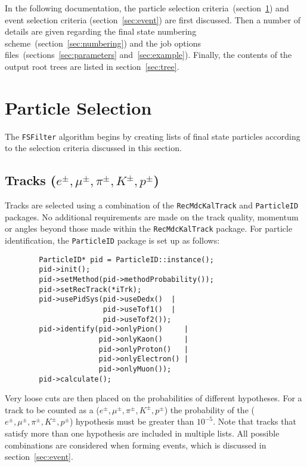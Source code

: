 \documentclass[11pt]{article}
\begin{document}
In the following documentation, the particle selection criteria~(section~\ref{sec:particles}) and event selection criteria (section~\ref{sec:event}) are first discussed.  Then a number of details are given regarding the final state numbering scheme~(section~\ref{sec:numbering}) and the job options files~(sections~\ref{sec:parameters} and~\ref{sec:example}).  Finally, the contents of the output root trees are listed in section~\ref{sec:tree}.


\section{Particle Selection}
\label{sec:particles}

The {\tt FSFilter} algorithm begins by creating lists of final state particles according to the selection criteria discussed in this section.

\subsection[Tracks ($e^{\pm},\mu^{\pm},\pi^{\pm},K^{\pm},p^{\pm}$)]{\boldmath Tracks ($e^{\pm},\mu^{\pm},\pi^{\pm},K^{\pm},p^{\pm}$)}

Tracks are selected using a combination of the {\tt RecMdcKalTrack} and {\tt ParticleID} packages.  No additional requirements are made on the track quality, momentum or angles beyond those made within the {\tt RecMdcKalTrack} package.  For particle identification, the {\tt ParticleID} package is set up as follows:
\begin{verbatim}
        ParticleID* pid = ParticleID::instance();
        pid->init();
        pid->setMethod(pid->methodProbability());
        pid->setRecTrack(*iTrk);
        pid->usePidSys(pid->useDedx()  | 
                       pid->useTof1()  | 
                       pid->useTof2());
        pid->identify(pid->onlyPion()     | 
                      pid->onlyKaon()     | 
                      pid->onlyProton()   | 
                      pid->onlyElectron() | 
                      pid->onlyMuon());
        pid->calculate();
\end{verbatim}
Very loose cuts are then placed on the probabilities of different hypotheses.  For a track to be counted as a ($e^{\pm},\mu^{\pm},\pi^{\pm},K^{\pm},p^{\pm}$) the probability of the ($e^{\pm},\mu^{\pm},\pi^{\pm},K^{\pm},p^{\pm}$) hypothesis must be greater than $10^{-5}$.  Note that tracks that satisfy more than one hypothesis are included in multiple lists.  All possible combinations are considered when forming events, which is discussed in section~\ref{sec:event}.
\end{document}
